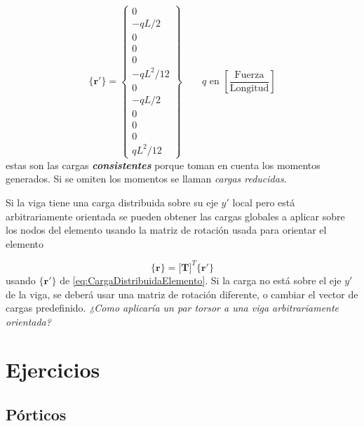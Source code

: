 \documentclass[11pt, a4paper,titlepage]{article}
\newcommand{\Mme}[1]{\boldsymbol{[}\mathbf{#1} \boldsymbol{]}}
\newcommand{\Cme}[1]{\boldsymbol{\{ }\mathbf{#1} \boldsymbol{\}} }
\begin{document}
\begin{equation} \label{eq:CargaDistribuidaElemento}
	\Cme{r'} = \begin{Bmatrix}
	0 \\
	-qL/2 \\
	0\\
	0\\
	0\\
	-qL^2/12\\
	0\\
	-qL/2 \\
	0\\
	0\\
	0\\
	qL^2/12
	\end{Bmatrix}
	\qquad q \text{  en } \left[\frac{\text{Fuerza}}{\text{Longitud}} \right]
\end{equation}
estas son las cargas \textbf{\textit{consistentes}} porque toman en cuenta los momentos generados. Si se omiten los momentos se llaman \textit{cargas reducidas}.

Si la viga tiene una carga distribuida sobre su eje $y'$ local pero está arbitrariamente orientada se pueden obtener las cargas globales a aplicar sobre los nodos del elemento usando la matriz de rotación usada para orientar el elemento

\begin{equation}
	\Cme{r}= \Mme{T}^T \Cme{r'}
\end{equation}
usando $\Cme{r'}$ de \eqref{eq:CargaDistribuidaElemento}. Si la carga no está sobre el eje $y'$ de la viga, se deberá usar una matriz de rotación diferente, o cambiar el vector de cargas predefinido. \textit{¿Como aplicaría un par torsor a una viga arbitrariamente orientada?}

\section{Ejercicios}
\subsection*{Pórticos}
\end{document}
